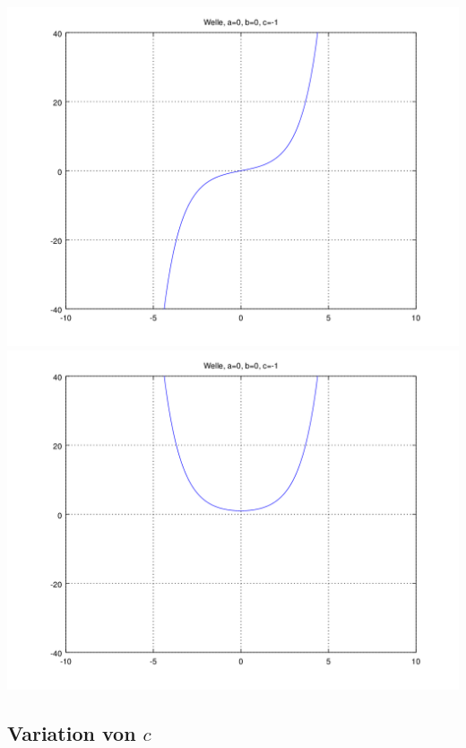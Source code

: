 \noindent
\includegraphics[scale=0.35]{./wellen/images/basicfunctions/sinh.png}
\includegraphics[scale=0.35]{./wellen/images/basicfunctions/cosh.png}

\subsection{Variation von \texorpdfstring{$c$}{c}}
\label{subsec:wellen:variationc}

